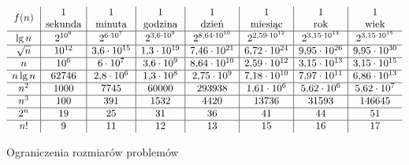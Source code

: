 \begin{table}[ht]
	\begin{center}
		\[
			\begin{array}{c|c|c|c|c|c|c|c}
				&1&1&1&1&1&1&1 \\
				\raisebox{1.5ex}[0cm][0cm]{$f(n)$} & \text{sekunda} & \text{minuta} & \text{godzina} & \text{dzień} & \text{miesiąc} & \text{rok} & \text{wiek} \\
				\hline
				\lg n & 2^{10^6} & 2^{6\cdot10^7} & 2^{3{,}6\cdot10^9} & 2^{8{,}64\cdot10^{10}} & 2^{2{,}59\cdot10^{12}} & 2^{3{,}15\cdot10^{13}} & 2^{3{,}15\cdot10^{15}} \\
				\hline
				\sqrt{n} & 10^{12} & 3{,}6\cdot10^{15} & 1{,}3\cdot10^{19} & 7{,}46\cdot10^{21} & 6{,}72\cdot10^{24} & 9{,}95\cdot10^{26} & 9{,}95\cdot10^{30} \\
				\hline
				n & 10^6 & 6\cdot10^7 & 3{,}6\cdot10^9 & 8{,}64\cdot10^{10} & 2{,}59\cdot10^{12} & 3{,}15\cdot10^{13} & 3{,}15\cdot10^{15} \\
				\hline
				n\lg n & 62746 & 2{,}8\cdot10^6 & 1{,}3\cdot10^8 & 2{,}75\cdot10^9 & 7{,}18\cdot10^{10} & 7{,}97\cdot10^{11} & 6{,}86\cdot10^{13} \\
				\hline
				n^2 & 1000 & 7745 & 60000 & 293938 & 1{,}61\cdot10^6 & 5{,}62\cdot10^6 & 5{,}62\cdot10^7 \\
				\hline
				n^3 & 100 & 391 & 1532 & 4420 & 13736 & 31593 & 146645 \\
				\hline
				2^n & 19 & 25 & 31 & 36 & 41 & 44 & 51 \\
				\hline
				n! & 9 & 11 & 12 & 13 & 15 & 16 & 17
			\end{array}
		\]
	\end{center}
	\caption{Ograniczenia rozmiarów problemów} \label{tab:1-1}
\end{table}

\endinput
